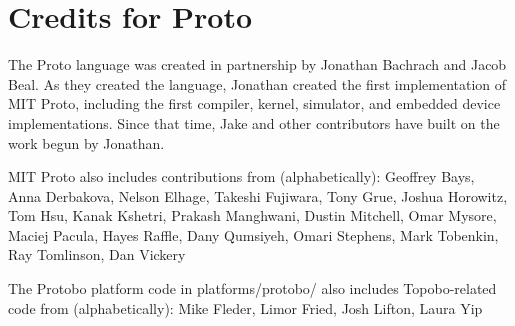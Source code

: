 
\section{Credits for Proto}

The Proto language was created in partnership by Jonathan Bachrach and
Jacob Beal.  As they created the language, Jonathan created the first
implementation of MIT Proto, including the first compiler, kernel,
simulator, and embedded device implementations.  Since that time, Jake
and other contributors have built on the work begun by Jonathan.

MIT Proto also includes contributions from (alphabetically):
%
  Geoffrey Bays, Anna Derbakova, Nelson Elhage, Takeshi Fujiwara, Tony
  Grue, Joshua Horowitz, Tom Hsu, Kanak Kshetri, Prakash Manghwani,
  Dustin Mitchell, Omar Mysore, Maciej Pacula, Hayes Raffle, Dany
  Qumsiyeh, Omari Stephens, Mark Tobenkin, Ray Tomlinson, Dan Vickery

The Protobo platform code in platforms/protobo/ also includes 
Topobo-related code from (alphabetically):
%
  Mike Fleder, Limor Fried, Josh Lifton, Laura Yip
